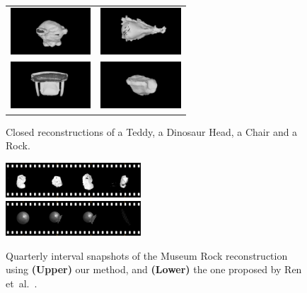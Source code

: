 \begin{figure}[!t]
	\centering
	\begin{tabular}{cc}
		\includegraphics[width=3cm]{screenshots/untextured/teddy_top00.png}&
		\includegraphics[width=3cm]{screenshots/untextured/dino_top00.png}\\
		\includegraphics[width=3cm]{screenshots/untextured/chair_top00.png}&
		\includegraphics[width=3cm]{screenshots/untextured/rock_top00.png}\\
	\end{tabular}
    \vspace{-3mm}
	\caption{
		Closed reconstructions of a Teddy, a Dinosaur Head, a Chair and a Rock.
	}
	\label{fig:top_shots}
\end{figure}

\begin{figure}[!t]
	\centering
		\includegraphics[width=0.45\textwidth]{filmstrips/rock.png} \\
		\vspace{0.5mm}
	    \includegraphics[width=0.45\textwidth]{filmstrips/rock_s3d_large.png}
	\caption{
		Quarterly interval snapshots of the Museum Rock reconstruction using \textbf{(Upper)} our method, and \textbf{(Lower)} the one proposed by Ren et~al.~\cite{Ren2013}.
	}
	\label{fig:rockComparison}
\end{figure}

